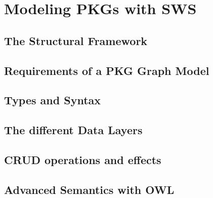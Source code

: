 \chapter{Modeling PKGs with SWS}
\section{The Structural Framework}
\section{Requirements of a PKG Graph Model}
\section{Types and Syntax}
\section{The different Data Layers}
\section{CRUD operations and effects}
\section{Advanced Semantics with OWL}